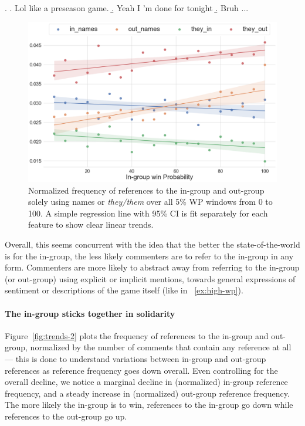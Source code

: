 \ex.\label{ex:low-wp} \a. Lol like a preseason game.
     \b. Yeah I ’m done for tonight
     \b. Bruh ...

\begin{figure}[t]
          \centering
          \includegraphics[width=\linewidth]{figures/trends-3.png}
          \caption{Normalized frequency of references to the in-group and out-group solely using names or \emph{they/them} over all 5\% WP windows from 0 to 100. A simple regression line with 95\% CI is fit separately for each feature to show clear linear trends.}
          \label{fig:trends-3}
      \end{figure}

Overall, this seems concurrent with the idea that the better the state-of-the-world is for the in-group, the less likely commenters are to refer to the in-group in any form. Commenters are more likely to abstract away from referring to the in-group (or out-group) using explicit or implicit mentions, towards general expressions of sentiment or descriptions of the game itself (like in ~\ref{ex:high-wp}).
    
\paragraph{The in-group sticks together in solidarity} Figure~\ref{fig:trends-2} plots the frequency of references to the in-group and out-group, normalized by the number of comments that contain any reference at all --- this is done to understand variations between in-group and out-group references as reference frequency goes down overall. Even controlling for the overall decline, we notice a marginal decline in (normalized) in-group reference frequency, and a steady increase in (normalized) out-group reference frequency. The more likely the in-group is to win, references to the in-group go down while references to the out-group go up.

